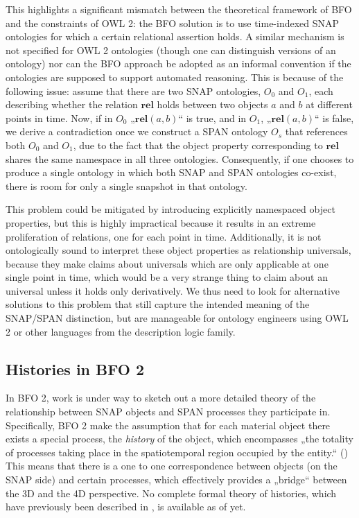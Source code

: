 \documentclass{ao2e}
\newcommand{\mirel}[1]{\ensuremath{\mathrm{\mathbf{#1}}}}
\begin{document}
This highlights a significant mismatch between the theoretical framework of BFO
and the constraints of OWL 2: the BFO solution is to use time-indexed SNAP
ontologies for which a certain relational assertion holds. A similar mechanism
is not specified for OWL 2 ontologies (though one can distinguish versions of an
ontology) nor can the BFO approach be adopted as an informal convention if the
ontologies are supposed to support automated reasoning. This is because of the
following issue: assume that there are two SNAP ontologies, $O_0$ and $O_1$, each
describing whether the relation \mirel{rel} holds between two objects $a$ and $b$ at
different points in time. Now, if in $O_0$ „$\mirel{rel}(a, b)$“ is true, and in
$O_1$, „$\mirel{rel}(a, b)$“ is false, we derive a contradiction once we construct a SPAN ontology
$O_s$ that references both $O_0$ and $O_1$, due to the fact that the object property
corresponding to \mirel{rel} shares the same namespace in all three ontologies.
Consequently, if one chooses to produce a single ontology in which both SNAP and
SPAN ontologies co-exist, there is room for only a single snapshot in that
ontology.


This problem could be mitigated by introducing explicitly namespaced object
properties, but this is highly impractical because it results in an extreme
proliferation of relations, one for each point in time. Additionally, it is not
ontologically sound to interpret these object properties as relationship
universals, because they make claims about universals which are only applicable
at one single point in time, which would be a very strange thing to claim about
an universal unless it holds only derivatively.
We thus need to look for alternative solutions to this problem that still
capture the intended meaning of the SNAP/SPAN distinction, but are manageable
for ontology engineers using OWL 2 or other languages from the description logic
family.
\subsection{Histories in BFO 2}

In BFO 2, work is under way to sketch out a more detailed theory of the
relationship between SNAP objects and SPAN processes they participate in.
Specifically, BFO 2 make the assumption that for each material object there
exists a special process, the \emph{history} of the object, which encompasses 
„the totality of processes taking place in the spatiotemporal region occupied by
the entity.“ (\cite{BFO2:ref}) This means that there is a one to one correspondence
between objects (on the SNAP side) and certain processes, which effectively
provides a „bridge“ between the 3D and the 4D perspective. No complete formal theory
of histories, which have previously been described in \cite{cornucopia}, is available as of yet.
\end{document}
